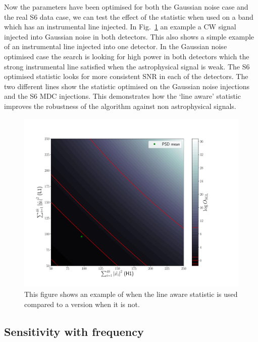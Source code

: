 Now the parameters have been optimised for both the Gaussian noise case and the real S6 data case, we can test the effect of the statistic when used on a band which has an instrumental line injected. 
In Fig.~\ref{viterbi:optimisation:vitexample} an example a \ac{CW} signal injected into Gaussian noise in both detectors. 
This also shows a simple example of an instrumental line injected into one detector. 
In the Gaussian noise optimised case the search is looking for high power in both detectors which the strong instrumental line satisfied when the astrophysical signal is weak. 
The S6 optimised statistic looks for more consistent \ac{SNR} in each of the detectors.
The two different lines show the statistic optimised on the Gaussian noise injections and the S6 \ac{MDC} injections.
This demonstrates how the `line aware' statistic improves the robustness of the algorithm against non astrophysical signals. 

\begin{figure}
    \centering
    \includegraphics[width=\linewidth]{C3_soap/lookup_noline.pdf}
    \caption{This figure shows an example of when the line aware statistic is used compared to a version when it is not.}
    \label{viterbi:optimisation:vitexample}
\end{figure}

\subsection{\label{viterbi:sens:freq}Sensitivity with frequency}


